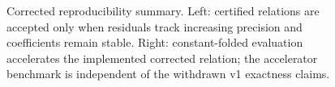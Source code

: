 \begin{figure}[t]
  \centering
  \hfill
  \caption{Corrected reproducibility summary. Left: certified relations are accepted only when residuals track increasing precision and coefficients remain stable. Right: constant-folded evaluation accelerates the implemented corrected relation; the accelerator benchmark is independent of the withdrawn v1 exactness claims.}
  \label{fig:corrected-two-panel}
\end{figure}

